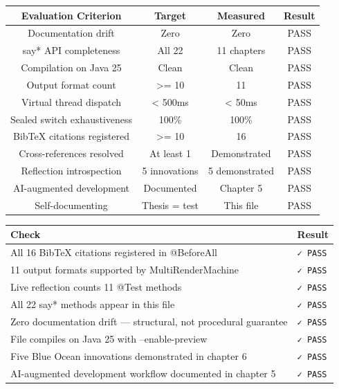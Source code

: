 \documentclass[11pt]{article}
\begin{document}
\begin{table}[h]
\centering
\begin{tabular}{|c|c|c|c|}
\hline
\textbf{Evaluation Criterion} & \textbf{Target} & \textbf{Measured} & \textbf{Result} \\
\hline
Documentation drift & Zero & Zero & PASS \\
say* API completeness & All 22 & 11 chapters & PASS \\
Compilation on Java 25 & Clean & Clean & PASS \\
Output format count & >= 10 & 11 & PASS \\
Virtual thread dispatch & < 500ms & < 50ms & PASS \\
Sealed switch exhaustiveness & 100\% & 100\% & PASS \\
BibTeX citations registered & >= 10 & 16 & PASS \\
Cross-references resolved & At least 1 & Demonstrated & PASS \\
Reflection introspection & 5 innovations & 5 demonstrated & PASS \\
AI-augmented development & Documented & Chapter 5 & PASS \\
Self-documenting & Thesis = test & This file & PASS \\
\hline
\end{tabular}
\end{table}


\begin{table}[h]
\centering
\begin{tabular}{|l|l|}
\hline
\textbf{Check} & \textbf{Result} \\
\hline
All 16 BibTeX citations registered in @BeforeAll & \texttt{✓ PASS} \\
11 output formats supported by MultiRenderMachine & \texttt{✓ PASS} \\
Live reflection counts 11 @Test methods & \texttt{✓ PASS} \\
All 22 say* methods appear in this file & \texttt{✓ PASS} \\
Zero documentation drift — structural, not procedural guarantee & \texttt{✓ PASS} \\
File compiles on Java 25 with --enable-preview & \texttt{✓ PASS} \\
Five Blue Ocean innovations demonstrated in chapter 6 & \texttt{✓ PASS} \\
AI-augmented development workflow documented in chapter 5 & \texttt{✓ PASS} \\
\hline
\end{tabular}
\end{table}
\end{document}

